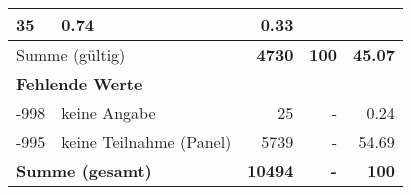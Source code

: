 \begin{longtable}{lXrrr}
       \num{35} &
       \num[round-mode=places,round-precision=2]{0,74} &
         \num[round-mode=places,round-precision=2]{0,33} \\
     \midrule
     \multicolumn{2}{l}{Summe (gültig)} &
       \textbf{\num{4730}} &
     \textbf{100} &
       \textbf{\num[round-mode=places,round-precision=2]{45,07}} \\
     \multicolumn{5}{l}{\textbf{Fehlende Werte}}\\
       -998 &
       keine Angabe &
         \num{25} &
        - &
         \num[round-mode=places,round-precision=2]{0,24} \\
       -995 &
       keine Teilnahme (Panel) &
         \num{5739} &
        - &
         \num[round-mode=places,round-precision=2]{54,69} \\
     \midrule
     \multicolumn{2}{l}{\textbf{Summe (gesamt)}} &
          \textbf{\num{10494}} &
        \textbf{-} &
        \textbf{100} \\
     \bottomrule
     \end{longtable}
     
